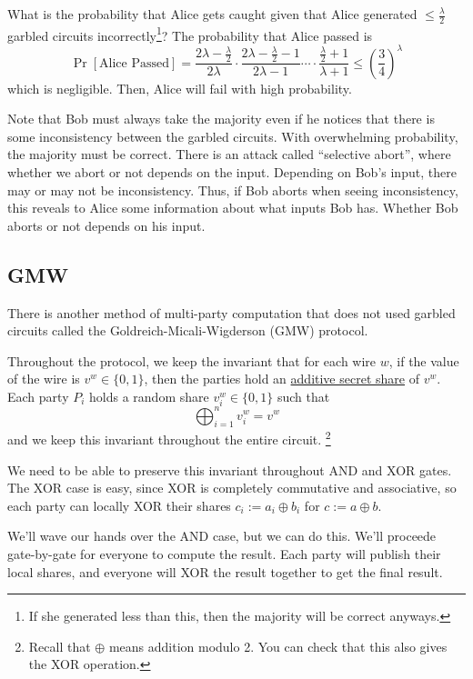 What is the probability that Alice gets caught given that Alice generated $\leq \frac{\lambda}{2}$ garbled circuits incorrectly\footnote{If she generated less than this, then the majority will be correct anyways.}? The probability that Alice passed is
\[\Pr\left[ \text{Alice Passed} \right] = \frac{2\lambda - \frac{\lambda}{2}}{2\lambda}\cdot \frac{2\lambda - \frac{\lambda}{2} - 1}{2\lambda - 1} \cdots \cdot \frac{\frac{\lambda}{2} + 1}{\lambda + 1} \leq \left( \frac{3}{4} \right)^\lambda\]
which is negligible. Then, Alice will fail with high probability.

Note that Bob must always take the majority even if he notices that there is some inconsistency between the garbled circuits. With overwhelming probability, the majority must be correct. There is an attack called ``selective abort'', where whether we abort or not depends on the input. Depending on Bob's input, there may or may not be inconsistency. Thus, if Bob aborts when seeing inconsistency, this reveals to Alice some information about what inputs Bob has. Whether Bob aborts or not depends on his input.

\subsection{GMW} \label{sec:mar23-gmw}

There is another method of multi-party computation that does not used garbled circuits called the Goldreich-Micali-Wigderson (GMW) protocol.

Throughout the protocol, we keep the invariant that for each wire $w$, if the value of the wire is $v^w \in\{0, 1\}$, then the parties hold an \ul{additive secret share} of $v^w$. Each party $P_i$ holds a random share $v_i^w\in\{0,1\}$ such that
\[\bigoplus_{i=1}^n v_i^w = v^w\]
and we keep this invariant throughout the entire circuit. \footnote{Recall that $\oplus$ means addition modulo 2. You can check that this also gives the XOR operation.}

We need to be able to preserve this invariant throughout \textsf{AND} and \textsf{XOR} gates. The \textsf{XOR} case is easy, since \textsf{XOR} is completely commutative and associative, so each party can locally \textsf{XOR} their shares $c_i := a_i\oplus b_i$ for $c := a\oplus b$.

We'll wave our hands over the \textsf{AND} case, but we can do this. We'll proceede gate-by-gate for everyone to compute the result. Each party will publish their local shares, and everyone will \textsf{XOR} the result together to get the final result.

